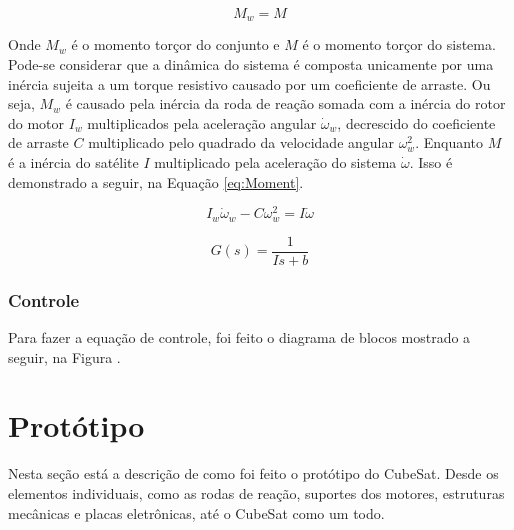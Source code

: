 \documentclass[
	12pt,				%
	openany,			%
	twoside,			%
	a4paper,			%
	english,			%
	french,				%
	spanish,			%
	brazil,				%
	oldfontcommands
	]{abntex2}
\begin{document}
\begin{equation}
M_{w} = M
\label{eq:Newton}
\end{equation}

Onde $M_{w}$ é o momento torçor do conjunto e $M$ é o momento torçor do sistema. Pode-se considerar que a dinâmica do sistema é composta unicamente por uma inércia sujeita a um torque resistivo causado por um coeficiente de arraste. Ou seja, $M_{w}$ é causado pela inércia da roda de reação somada com a inércia do rotor do motor $I_{w}$ multiplicados pela aceleração angular $\dot{\omega}_{w}$, decrescido do coeficiente de arraste $C$ multiplicado pelo quadrado da velocidade angular $\omega_{w}^{2}$. Enquanto $M$ é a inércia do satélite $I$ multiplicado pela aceleração do sistema $\dot{\omega}$. Isso é demonstrado a seguir, na Equação \ref{eq:Moment}.

\begin{equation}
I_{w}\dot{\omega}_{w} - C\omega_{w}^{2} = I\dot{\omega}
\label{eq:Moment}
\end{equation}

\begin{equation}
G(s) = \frac{1}{Is + b}
\label{eq:SDM}
\end{equation}

\subsection{Controle}

Para fazer a equação de controle, foi feito o diagrama de blocos mostrado a seguir, na Figura .

%	

\chapter[Protótipo]{Protótipo}

Nesta seção está a descrição de como foi feito o protótipo do CubeSat. Desde os elementos individuais, como as rodas de reação, suportes dos motores, estruturas mecânicas e placas eletrônicas, até o CubeSat como um todo.
\end{document}
